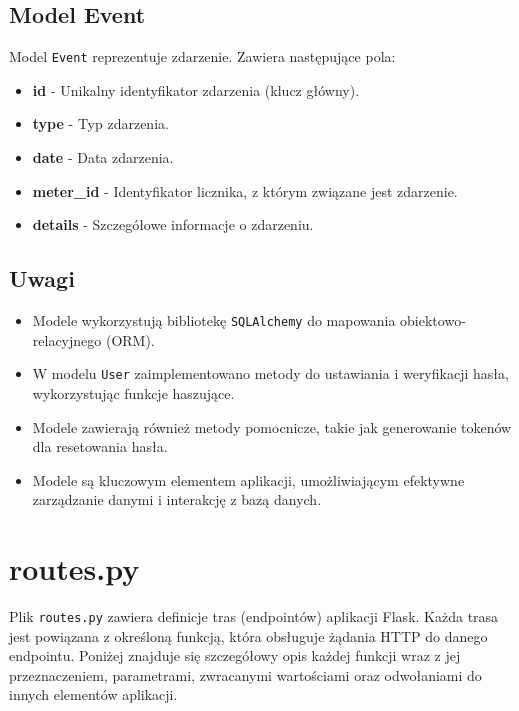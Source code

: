 \documentclass[12pt,a4paper]{report}
\begin{document}
\subsection{Model Event}
Model \texttt{Event} reprezentuje zdarzenie. Zawiera następujące pola:
\begin{itemize}
    \item \textbf{id} - Unikalny identyfikator zdarzenia (klucz główny).
    \item \textbf{type} - Typ zdarzenia.
    \item \textbf{date} - Data zdarzenia.
    \item \textbf{meter\_id} - Identyfikator licznika, z którym związane jest zdarzenie.
    \item \textbf{details} - Szczegółowe informacje o zdarzeniu.
\end{itemize}

\subsection{Uwagi}
\begin{itemize}
    \item Modele wykorzystują bibliotekę \texttt{SQLAlchemy} do mapowania obiektowo-relacyjnego (ORM).
    \item W modelu \texttt{User} zaimplementowano metody do ustawiania i weryfikacji hasła, wykorzystując funkcje haszujące.
    \item Modele zawierają również metody pomocnicze, takie jak generowanie tokenów dla resetowania hasła.
    \item Modele są kluczowym elementem aplikacji, umożliwiającym efektywne zarządzanie danymi i interakcję z bazą danych.
\end{itemize}

\section{routes.py}
\label{sec:routes}

Plik \texttt{routes.py} zawiera definicje tras (endpointów) aplikacji Flask. Każda trasa jest powiązana z określoną funkcją, która obsługuje żądania HTTP do danego endpointu. Poniżej znajduje się szczegółowy opis każdej funkcji wraz z jej przeznaczeniem, parametrami, zwracanymi wartościami oraz odwołaniami do innych elementów aplikacji.
\end{document}
